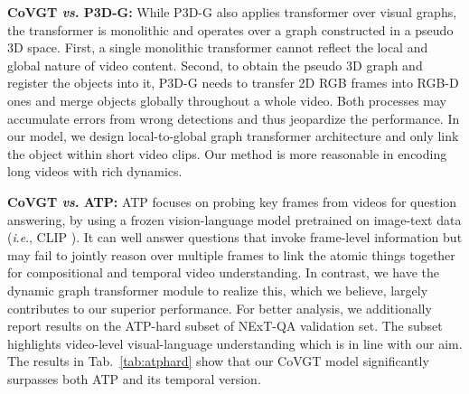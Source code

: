 \documentclass[10pt,journal,compsoc]{IEEEtran}
\newcommand{\vs}{\textit{vs}. }
\newcommand{\ie}{\textit{i}.\textit{e}.}
\begin{document}
\textbf{CoVGT \vs P3D-G:} While P3D-G \cite{cherian2022} also applies transformer over visual graphs, the transformer is monolithic and operates over a graph constructed in a pseudo 3D space. First, a single monolithic transformer cannot reflect the local and global nature of video content. Second, to obtain the pseudo 3D graph and register the objects into it, P3D-G needs to transfer 2D RGB frames into RGB-D ones and merge objects globally throughout a whole video. Both processes may accumulate errors from wrong detections and thus jeopardize the performance. In our model, we design local-to-global graph transformer architecture and only link the object within short video clips. Our method is more reasonable in encoding long videos with rich dynamics. 

\textbf{CoVGT \vs ATP:} ATP \cite{buch2022revisiting} focuses on probing key frames from videos for question answering, by using a frozen vision-language model pretrained on image-text data (\ie, CLIP \cite{radford2021learning}). It can well answer questions that invoke frame-level information but may fail to jointly reason over multiple frames to link the atomic things together for compositional and temporal video understanding. In contrast, we have the dynamic graph transformer module to realize this, which we believe, largely contributes to our superior performance. For better analysis, we additionally report results on the ATP-hard subset of NExT-QA validation set. The subset highlights video-level visual-language understanding which is in line with our aim. The results in Tab.~\ref{tab:atphard} show that our CoVGT model significantly surpasses both ATP and its temporal version. 

\setlength{\tabcolsep}{7pt}
\begin{table}[t!]
    \small
    \centering
    \caption{Comparison on ATP-hard subset \cite{buch2022revisiting} of NExT-QA.
    }
    \vspace{-0.5em}
    \vspace{-0.4cm}
    \label{tab:atphard}
\end{table}
\end{document}

